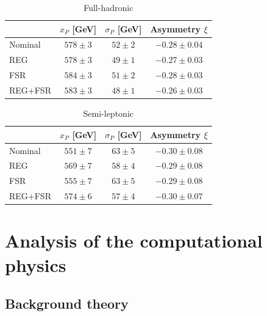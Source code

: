 \documentclass[a4paper]{article}
\begin{document}
\pagebreak

\begin{table}
\centering
\begin{tabular}{l|c|c|c}
\hline
 &  $x_P$ [GeV] &  $\sigma_P$ [GeV] & Asymmetry $\xi$ \\
\hline
Nominal                       & $578 \pm 3$       & $52 \pm 2$        & $-0.28 \pm 0.04$  \\
REG                           & $578 \pm 3$       & $49 \pm 1$        & $-0.27 \pm 0.03$  \\
FSR                           & $584 \pm 3$       & $51 \pm 2$        & $-0.28 \pm 0.03$  \\
REG+FSR                       & $583 \pm 3$       & $48 \pm 1$        & $-0.26 \pm 0.03$  \\
\hline
\end{tabular}
\caption{ Full-hadronic }
\end{table}
\vspace{0.1cm}


\begin{table}
\centering
\begin{tabular}{l|c|c|c}
\hline
 &  $x_P$ [GeV] &  $\sigma_P$ [GeV] & Asymmetry $\xi$ \\
\hline
Nominal     & $551 \pm 7$       & $63 \pm 5$           & $-0.30 \pm 0.08$  \\                    
REG         & $569 \pm 7$       & $58 \pm 4$           & $-0.29 \pm 0.08$  \\                   
FSR         & $555 \pm 7$       & $63 \pm 5$           & $-0.29 \pm 0.08$  \\                 
REG+FSR     & $574 \pm 6$       & $57 \pm 4$           & $-0.30 \pm 0.07$  \\
               
\hline
\end{tabular}
\caption{ Semi-leptonic }
\end{table}
\vspace{0.1cm}


\pagebreak

\section{Analysis of the computational physics}

\subsection{Background theory}
\end{document}
